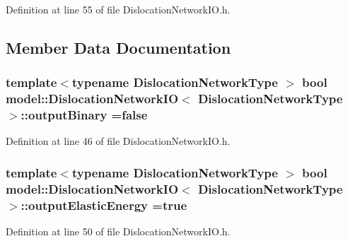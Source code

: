 Definition at line 55 of file Dislocation\+Network\+I\+O.\+h.



\subsection{Member Data Documentation}
\hypertarget{structmodel_1_1_dislocation_network_i_o_a835ea647153ba2dc77cfefea5cc864f8}{}
\subsubsection[{output\+Binary}]{\setlength{\rightskip}{0pt plus 5cm}template$<$typename Dislocation\+Network\+Type $>$ bool {\bf model\+::\+Dislocation\+Network\+I\+O}$<$ Dislocation\+Network\+Type $>$\+::output\+Binary =false\hspace{0.3cm}{\ttfamily [static]}}\label{structmodel_1_1_dislocation_network_i_o_a835ea647153ba2dc77cfefea5cc864f8}


Definition at line 46 of file Dislocation\+Network\+I\+O.\+h.

\hypertarget{structmodel_1_1_dislocation_network_i_o_afa7d59390353ba504bc510f4bd932883}{}
\subsubsection[{output\+Elastic\+Energy}]{\setlength{\rightskip}{0pt plus 5cm}template$<$typename Dislocation\+Network\+Type $>$ bool {\bf model\+::\+Dislocation\+Network\+I\+O}$<$ Dislocation\+Network\+Type $>$\+::output\+Elastic\+Energy =true\hspace{0.3cm}{\ttfamily [static]}}\label{structmodel_1_1_dislocation_network_i_o_afa7d59390353ba504bc510f4bd932883}


Definition at line 50 of file Dislocation\+Network\+I\+O.\+h.

\hypertarget{structmodel_1_1_dislocation_network_i_o_a332e7031dfa21ac57b3d9816bb895007}{}
